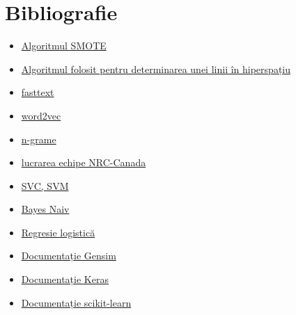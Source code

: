 \chapter*{Bibliografie} 

\begin{itemize}
    \item \href{https://machinelearningmastery.com/smote-oversampling-for-imbalanced-classification/}{Algoritmul SMOTE}
    \item \href{http://mathcentral.uregina.ca/QQ/database/QQ.09.01/murray2.html}{Algoritmul folosit pentru determinarea unei linii în hiperspațiu}
    \item \href{https://towardsdatascience.com/fasttext-under-the-hood-11efc57b2b3}{fasttext}
    \item \href{https://www.analyticsvidhya.com/blog/2017/06/word-embeddings-count-word2veec/}{word2vec}
    \item \href{https://web.stanford.edu/~jurafsky/slp3/ed3book.pdf}{n-grame}
    \item \href{https://arxiv.org/pdf/1805.04558.pdf}{lucrarea echipe NRC-Canada}
    \item \href{https://www.analyticsvidhya.com/blog/2020/03/support-vector-regression-tutorial-for-machine-learning/}{SVC, SVM}
    \item \href{https://www.analyticsvidhya.com/blog/2017/09/naive-bayes-explained/}{Bayes Naiv}
    \item \href{https://machinelearningmastery.com/logistic-regression-for-machine-learning/}{Regresie logistică}
    \item \href{https://radimrehurek.com/gensim/models/word2vec.html}{Documentație Gensim}
    \item \href{https://keras.io/api/}{Documentație Keras}
    \item \href{https://scikit-learn.org/stable/user_guide.html}{Documentație scikit-learn}
\end{itemize}